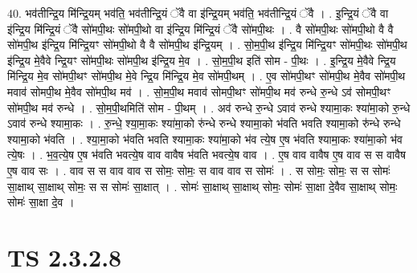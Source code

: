 \documentclass[17pt]{extarticle}
\begin{document}
40. भव॑तीन्द्रि॒य मि॑न्द्रि॒यम् भव॑ति॒ भव॑तीन्द्रि॒यं ॅवै वा इ॑न्द्रि॒यम् भव॑ति॒ भव॑तीन्द्रि॒यं ॅवै । . इ॒न्द्रि॒यं ॅवै वा इ॑न्द्रि॒य मि॑न्द्रि॒यं ॅवै सो॑मपी॒थः सो॑मपी॒थो वा इ॑न्द्रि॒य मि॑न्द्रि॒यं ॅवै सो॑मपी॒थः । . वै सो॑मपी॒थः सो॑मपी॒थो वै वै सो॑मपी॒थ इ॑न्द्रि॒य मि॑न्द्रि॒यꣳ सो॑मपी॒थो वै वै सो॑मपी॒थ इ॑न्द्रि॒यम् । . सो॒म॒पी॒थ इ॑न्द्रि॒य मि॑न्द्रि॒यꣳ सो॑मपी॒थः सो॑मपी॒थ इ॑न्द्रि॒य मे॒वैवे न्द्रि॒यꣳ सो॑मपी॒थः सो॑मपी॒थ इ॑न्द्रि॒य मे॒व । . सो॒म॒पी॒थ इति॑ सोम - पी॒थः । . इ॒न्द्रि॒य मे॒वैवे न्द्रि॒य मि॑न्द्रि॒य मे॒व सो॑मपी॒थꣳ सो॑मपी॒थ मे॒वे न्द्रि॒य मि॑न्द्रि॒य मे॒व सो॑मपी॒थम् । . ए॒व सो॑मपी॒थꣳ सो॑मपी॒थ मे॒वैव सो॑मपी॒थ मवाव॑ सोमपी॒थ मे॒वैव सो॑मपी॒थ मव॑ । . सो॒म॒पी॒थ मवाव॑ सोमपी॒थꣳ सो॑मपी॒थ मव॑ रुन्धे रु॒न्धे ऽव॑ सोमपी॒थꣳ सो॑मपी॒थ मव॑ रुन्धे । . सो॒म॒पी॒थमिति॑ सोम - पी॒थम् । . अव॑ रुन्धे रु॒न्धे ऽवाव॑ रुन्धे श्यामा॒कः श्या॑मा॒को रु॒न्धे ऽवाव॑ रुन्धे श्यामा॒कः । . रु॒न्धे॒ श्या॒मा॒कः श्या॑मा॒को रु॑न्धे रुन्धे श्यामा॒को भ॑वति भवति श्यामा॒को रु॑न्धे रुन्धे श्यामा॒को भ॑वति । . श्या॒मा॒को भ॑वति भवति श्यामा॒कः श्या॑मा॒को भ॑व त्ये॒ष ए॒ष भ॑वति श्यामा॒कः श्या॑मा॒को भ॑व त्ये॒षः । . भ॒व॒त्ये॒ष ए॒ष भ॑वति भवत्ये॒ष वाव वावैष भ॑वति भवत्ये॒ष वाव । . ए॒ष वाव वावैष ए॒ष वाव स स वावैष ए॒ष वाव सः । . वाव स स वाव वाव स सोमः॒ सोमः॒ स वाव वाव स सोमः॑ । . स सोमः॒ सोमः॒ स स सोमः॑ सा॒क्षाथ् सा॒क्षाथ् सोमः॒ स स सोमः॑ सा॒क्षात् । . सोमः॑ सा॒क्षाथ् सा॒क्षाथ् सोमः॒ सोमः॑ सा॒क्षा दे॒वैव सा॒क्षाथ् सोमः॒ सोमः॑ सा॒क्षा दे॒व । \newline
\pagebreak
{}

\section{ TS 2.3.2.8 }
\end{document}
